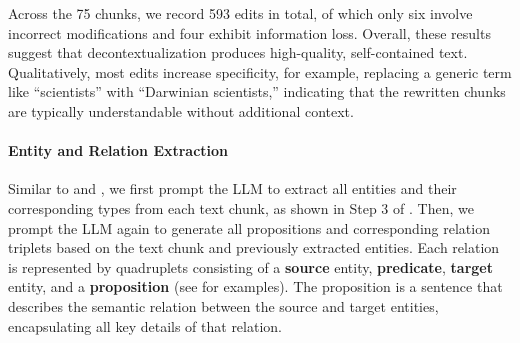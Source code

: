 \documentclass{article} %
\begin{document}
Across the 75 chunks, we record 593 edits in total, of which only six involve incorrect modifications and four exhibit information loss. Overall, these results suggest that decontextualization produces high-quality, self-contained text. Qualitatively, most edits increase specificity, for example, replacing a generic term like “scientists” with “Darwinian scientists,” indicating that the rewritten chunks are typically understandable without additional context.





\paragraph{Entity and Relation Extraction} 
\label{sec:relation-extraction}

Similar to \citet{edge2024from} and \citet{gutiérrez2024hipporag}, we first prompt the LLM to extract all entities and their corresponding types from each text chunk, as shown in Step 3 of . Then, we prompt the LLM again to generate all propositions and corresponding relation triplets based on the text chunk and previously extracted entities. Each relation is represented by quadruplets consisting of a \textbf{source} entity, \textbf{predicate}, \textbf{target} entity, and a \textbf{proposition} (see  for examples). The proposition is a sentence that describes the semantic relation between the source and target entities, encapsulating all key details of that relation.
\end{document}

